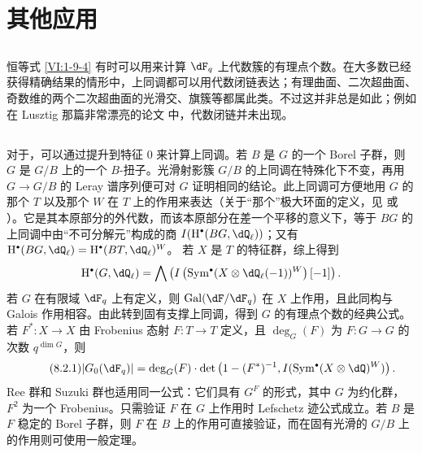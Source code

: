 \section{其他应用}\label{VI:8}

\subsection{}\label{VI:8-1}
恒等式 \ref{VI:1-9-4} 有时可以用来计算 $\dF_q$ 上代数簇的有理点个数。在大多数已经获得精确结果的情形中，上同调都可以用代数闭链表达；有理曲面、二次超曲面、奇数维的两个二次超曲面的光滑交、旗簇等都属此类。不过这并非总是如此；例如在 Lusztig 那篇非常漂亮的论文 \cite{lu76} 中，代数闭链并未出现。

\subsection{}\label{VI:8-2}
对于，可以通过提升到特征 $0$ 来计算上同调。若 $B$ 是 $G$ 的一个 Borel 子群，则 $G$ 是 $G/B$ 上的一个 $B$-扭子。光滑射影簇 $G/B$ 的上同调在特殊化下不变，再用 $G\to G/B$ 的 Leray 谱序列便可对 $G$ 证明相同的结论。此上同调可方便地用 $G$ 的那个 $T$ 以及那个  $W$ 在 $T$ 上的作用来表达（关于“那个”极大环面的定义，见 \cite[VIII，\S2，备注 2]{bo05} 或 \cite[p.105]{dl76}）。它是其本原部分的外代数，而该本原部分在差一个平移的意义下，等于 $BG$ 的上同调中由“不可分解元”构成的商
$I(\h^\bullet(BG,\dQ_\ell))$；又有
$\h^\bullet(BG,\dQ_\ell)=\h^\bullet(BT,\dQ_\ell)^W$。
若 $X$ 是 $T$ 的特征群，综上得到
\[
\h^\bullet(G,\dQ_\ell)=\bigwedge\left(
 I\left(\operatorname{Sym}^\bullet(X\otimes\dQ_\ell(-1))^W\right)[-1]\right).
\]
若 $G$ 在有限域 $\dF_q$ 上有定义，则 $\gal(\dF/\dF_q)$ 在 $X$ 上作用，且此同构与 Galois 作用相容。由此转到固有支撑上同调，得到 $G$ 的有理点个数的经典公式。若
$F^\ast:X\to X$ 由 Frobenius 态射 $F:T\to T$ 定义，且 $\deg_G(F)$ 为 $F:G\to G$ 的次数 $q^{\dim G}$，则
\begin{equation*}\tag{8.2.1}\label{VI:eq:8-2-1}
|G_0(\dF_q)|=\deg_G(F)\cdot
\det\left(1-(F^\ast)^{-1},I(\operatorname{Sym}^\bullet(X\otimes\dQ)^W)\right).
\end{equation*}
Ree 群和 Suzuki 群也适用同一公式：它们具有 $G^F$ 的形式，其中 $G$ 为约化群，$F^2$ 为一个 Frobenius。只需验证 $F$ 在 $G$ 上作用时 Lefschetz 迹公式成立。若 $B$ 是 $F$ 稳定的 Borel 子群，则 $F$ 在 $B$ 上的作用可直接验证，而在固有光滑的 $G/B$ 上的作用则可使用一般定理。

